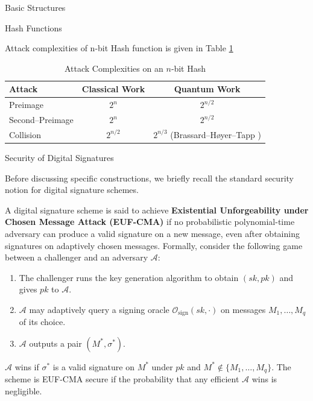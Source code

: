 \documentclass[version=preprint]{iacrcc}
\begin{document}
\begin{section}{Basic Structures}{\label{sec1}}
\begin{subsection}{Hash Functions}
\begin{enumerate}[label=\textbf{\arabic*.}]
    \end{enumerate}

Attack complexities of n-bit Hash function is given in Table \ref{tab:hash-complexities}

\begin{table}[h!]
  \centering
  \caption{Attack Complexities on an \(n\)‐bit Hash}
  \label{tab:hash-complexities}
  \begin{tabular}{|l|c|c|}
    \hline
    \textbf{Attack}            & \textbf{Classical Work} & \textbf{Quantum Work} \\ \hline
    Preimage                   & \(2^n\)                 & \(2^{n/2}\)           \\ \hline
    Second–Preimage            & \(2^n\)                 & \(2^{n/2}\)           \\ \hline
    Collision                  & \(2^{n/2}\)             & \(2^{n/3}\) (Brassard–Høyer–Tapp \cite{Brassard_1998}) \\ \hline
  \end{tabular}
\end{table}

\end{subsection}

\begin{subsection}{Security of Digital Signatures}

Before discussing specific constructions, we briefly recall the standard security notion for digital signature schemes.

A digital signature scheme is said to achieve \textbf{Existential Unforgeability under Chosen Message Attack (EUF-CMA)} if no probabilistic polynomial-time adversary can produce a valid signature on a new message, even after obtaining signatures on adaptively chosen messages. Formally, consider the following game between a challenger and an adversary $\mathcal{A}$:

\begin{enumerate}
    \item The challenger runs the key generation algorithm to obtain $(sk, pk)$ and gives $pk$ to $\mathcal{A}$.
    \item $\mathcal{A}$ may adaptively query a signing oracle $\mathcal{O}_{\text{sign}}(sk, \cdot)$ on messages $M_1, \ldots, M_q$ of its choice.
    \item $\mathcal{A}$ outputs a pair $(M^*, \sigma^*)$.
\end{enumerate}

$\mathcal{A}$ wins if $\sigma^*$ is a valid signature on $M^*$ under $pk$ and $M^* \notin \{M_1, \ldots, M_q\}$. The scheme is EUF-CMA secure if the probability that any efficient $\mathcal{A}$ wins is negligible.


\end{subsection}
\end{section}
\end{document}

